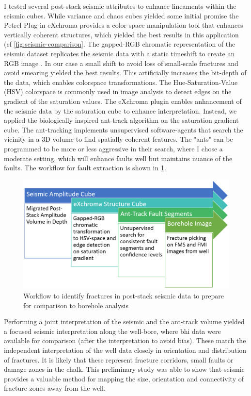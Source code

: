 I tested several post-stack seismic attributes to enhance lineaments within the seismic cubes. While variance and chaos cubes yielded some initial promise the Petrel Plug-in eXchroma provides a color-space manipulation tool that enhances vertically coherent structures, which yielded the best results in this application (cf \cref{fig:seismic-comparison}. The gapped-RGB chromatic representation of the seismic dataset replicates the seismic data with a static timeshift to create an RGB image \citep{laake2014structural}. In our case a small shift to avoid loss of small-scale fractures and avoid smearing yielded the best results. This artificially increases the bit-depth of the data, which enables colorspace transformations. The Hue-Saturation-Value (HSV) colorspace is commonly used in image analysis to detect edges on the gradient of the saturation values. The eXchroma plugin enables anhancement of the seismic data by the saturation cube to enhance interpretation. Instead, we applied the biologically inspired ant-track algorithm on the saturation gradient cube. The ant-tracking implements unsupervised software-agents that search the vicinity in a 3D volume to find spatially coherent features. The "ants" can be programmed to be more or less aggressive in their search, where I chose a moderate setting, which will enhance faults well but maintains nuance of the faults. The workflow for fault extraction is shown in \cref{fig:seismic-workflow}.

\begin{figure}[!ht]
    \centering
    \includegraphics[width=\textwidth]{figures/fracture-workflow.PNG}
    \caption{Workflow to identify fractures in post-stack seismic data to prepare for comparison to borehole analysis}
    \label{fig:seismic-workflow}
\end{figure}

Performing a joint interpretation of the seismic and the ant-track volume yielded a focused seismic interpretation along the well-bore, where \acf{bhi} data were available for comparison (after the interpretation to avoid bias). These match the independent interpretation of the well data closely in orientation and distribution of fractures. It is likely that these represent fracture corridors, small faults or damage zones in the chalk. This preliminary study was able to show that seismic provides a valuable method for mapping the size, orientation and connectivity of fracture zones away from the well. 

